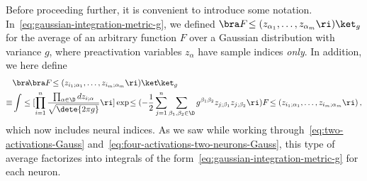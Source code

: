 Before proceeding further, it is convenient to introduce some notation. 
In~\eqref{eq:gaussian-integration-metric-g}, we defined $\bra F\!\le(z_{\alpha_1},\ldots, z_{\alpha_m}\ri) \ket_{g}$
for the average of an arbitrary function $F$ over a Gaussian distribution with variance $g$, where preactivation variables $z_{\alpha}$ have sample indices \emph{only}. 
In addition, we here define
\begin{align}\label{eq:many-neuron-gaussian-notation}
&\bra\!\bra F\!\le(z_{i_1;\alpha_1},\ldots, z_{i_{m};\alpha_m}\ri)\ket\!\ket_{g}\, \\
\equiv& \int \le[\prod_{i=1}^{n}\frac{\prod_{\alpha\in\D} dz_{i;\alpha}}{\sqrt{\dete{2\pi g}}}\ri]\exp\!\le(-\frac{1}{2}\sum_{j=1}^n\sum_{\beta_1,\beta_2\in\D}g^{\beta_1 \beta_2}z_{j;\beta_1}z_{j;\beta_2}\ri) F\!\le(z_{i_1;\alpha_1},\ldots, z_{i_m;\alpha_m}\ri)\,, \nonumber
\end{align}
which now includes neural indices. As we saw while working through~\eqref{eq:two-activations-Gauss} and~\eqref{eq:four-activations-two-neurons-Gauss}, this type of average factorizes into integrals of the form~\eqref{eq:gaussian-integration-metric-g} for each neuron.


